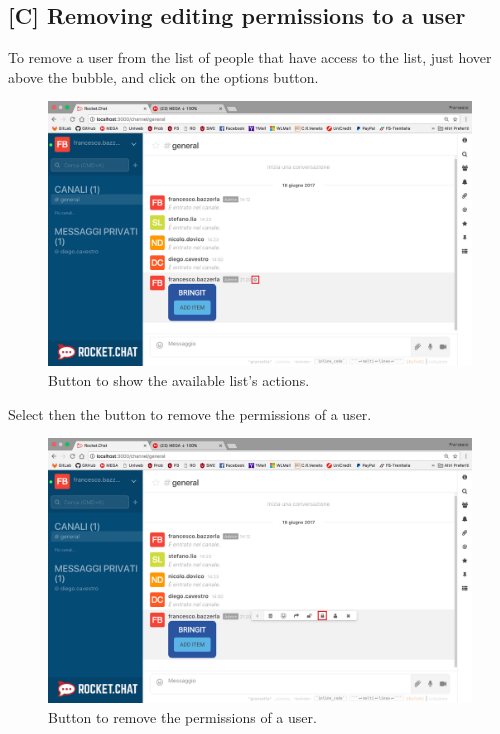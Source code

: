 \newpage
\subsection{[C] Removing editing permissions to a user}
To remove a user from the list of people that have access to the list, just hover above the bubble, and click on the options button.

\begin{figure}[H]
  \centering 
  \includegraphics[width=\textwidth]{Sections/3-HowToUse/Images/bubble_options_button.png}
  \caption{Button to show the available list's actions.}
\end{figure}

Select then the button to remove the permissions of a user.

\begin{figure}[H]
  \centering 
  \includegraphics[width=\textwidth]{Sections/3-HowToUse/Images/bubble_option_permission_remove.png}
  \caption{Button to remove the permissions of a user.}
\end{figure}

